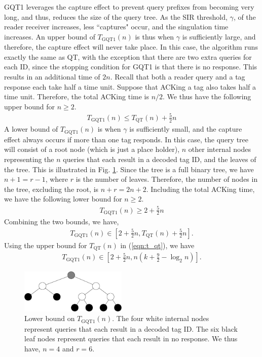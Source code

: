 \documentclass[conference]{IEEEtran}
\begin{document}
GQT1 leverages the capture effect to prevent query prefixes from becoming very long, and thus, reduces the size of the query tree.  As the SIR threshold, $\gamma$, of the reader receiver increases, less ``captures" occur, and the singulation time increases.   An upper bound of $T_{\mbox{GQT1}}\left(n\right)$ is thus when $\gamma$ is sufficiently large, and therefore, the capture effect will never take place.  In this case, the algorithm runs exactly the same as QT, with the exception that there are two extra queries for each ID, since the stopping condition for GQT1 is that there is no response.  This results in an additional time of $2n$.  Recall that both a reader query and a tag response each take half a time unit.  Suppose that ACKing a tag also takes half a time unit.  Therefore, the total ACKing time is $n/2$.  We thus have the following upper bound for $n\geq2$.
\begin{eqnarray}
T_{\mbox{GQT1}}\left(n\right) \leq T_{\mbox{QT}}\left(n\right) + \frac{5}{2} n \nonumber
\end{eqnarray}
A lower bound of $T_{\mbox{GQT1}}\left(n\right)$ is when $\gamma$ is sufficiently small, and the capture effect always occurs if more than one tag responds.  In this case, the query tree will consist of a root node (which is just a place holder), $n$ other internal nodes representing the $n$ queries that each result in a decoded tag ID, and the leaves of the tree.  This is illustrated in Fig. \ref{fig:fig4}.  Since the tree is a full binary tree, we have $n+1 = r - 1$, where $r$ is the number of leaves.  Therefore, the number of nodes in the tree, excluding the root, is $n + r = 2n + 2$.  Including the total ACKing time, we have the following lower bound for $n\geq2$.
\begin{eqnarray}
T_{\mbox{GQT1}}\left(n\right) \geq 2 + \frac{5}{2} n \nonumber
\end{eqnarray}
Combining the two bounds, we have,
\begin{eqnarray}
T_{\mbox{GQT1}}\left(n\right) \in   \left[2 + \frac{5}{2} n, T_{\mbox{QT}}\left(n\right) + \frac{5}{2} n\right].
\label{eqn:t_gqt1_1}
\end{eqnarray}
Using the upper bound for $T_{\mbox{QT}}\left(n\right)$  in (\ref{eqn:t_qt}), we have
\begin{eqnarray}
T_{\mbox{GQT1}}\left(n\right) \in   \left[2 + \frac{5}{2} n, n \left( k + \frac{9}{2} - \log_2 n\right) \right].
\label{eqn:t_gqt1_2}
\end{eqnarray}
\begin{figure}
\centering
\includegraphics[width=2in]{fig4.eps}
\caption{Lower bound on $T_{\mbox{GQT1}}\left(n\right)$.  The four white internal nodes represent queries that each result in a decoded tag ID.  The six black leaf nodes represent queries that each result in no response.  We thus have, $n = 4$ and $r = 6$. \label{fig:fig4}}
\end{figure}
\end{document}

